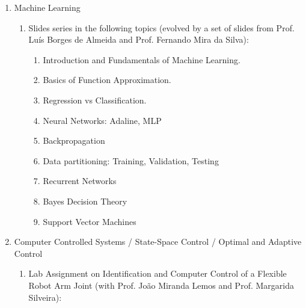 \documentclass[
]{article}
\begin{document}
\begin{enumerate}
\begin{enumerate}
    \begin{enumerate}
    \def\labelenumiii{\roman{enumiii}.}
    \item
      Physical modelling and Matlab simulation.
    \item
      Parametric Identification from Step Response.
    \item
      Determination of Control
    \item
      Parametric Identification from data: ARX and ARMAX models.
    \item
      Polynomial Control with two degrees of freedom.
    \item
      Cascaded Control
    \item
      Adaptative Control
    \end{enumerate}
  \end{enumerate}
\item
  Machine Learning

  \begin{enumerate}
  \def\labelenumii{\alph{enumii}.}
  \item
    Slides series in the following topics (evolved by a set of slides
    from Prof. Luís Borges de Almeida and Prof. Fernando Mira da Silva):

    \begin{enumerate}
    \def\labelenumiii{\roman{enumiii}.}
    \item
      Introduction and Fundamentals of Machine Learning.
    \item
      Basics of Function Approximation.
    \item
      Regression vs Classification.
    \item
      Neural Networks: Adaline, MLP
    \item
      Backpropagation
    \item
      Data partitioning: Training, Validation, Testing
    \item
      Recurrent Networks
    \item
      Bayes Decision Theory
    \item
      Support Vector Machines
    \end{enumerate}
  \end{enumerate}
\item
  Computer Controlled Systems / State-Space Control / Optimal and
  Adaptive Control

  \begin{enumerate}
  \def\labelenumii{\alph{enumii}.}
  \item
    Lab Assignment on Identification and Computer Control of a Flexible
    Robot Arm Joint (with Prof. João Miranda Lemos and Prof. Margarida
    Silveira):


\end{enumerate}
\end{enumerate}
\end{document}
